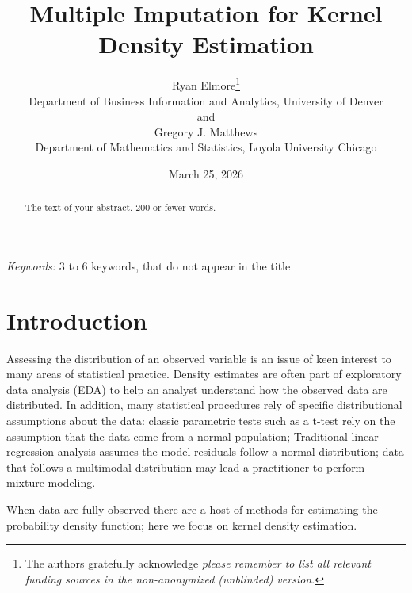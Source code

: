 \documentclass[
  12pt]{article}
\begin{document}
\def\spacingset#1{\renewcommand{\baselinestretch}%
{#1}\small\normalsize} \spacingset{1}



\date{March 25, 2026}
\title{\bf Multiple Imputation for Kernel Density Estimation}
\author{
Ryan Elmore\thanks{The authors gratefully acknowledge \emph{please
remember to list all relevant funding sources in the non-anonymized
(unblinded) version}.}\\
Department of Business Information and Analytics, University of Denver\\
and\\Gregory J. Matthews\\
Department of Mathematics and Statistics, Loyola University Chicago\\
}
\maketitle

\bigskip
\bigskip
\begin{abstract}
The text of your abstract. 200 or fewer words.
\end{abstract}

\noindent%
{\it Keywords:} 3 to 6 keywords, that do not appear in the title
\vfill

\newpage
\spacingset{1.9} %


\section{Introduction}\label{sec-intro}

Assessing the distribution of an observed variable is an issue of keen
interest to many areas of statistical practice. Density estimates are
often part of exploratory data analysis (EDA) to help an analyst
understand how the observed data are distributed. In addition, many
statistical procedures rely of specific distributional assumptions about
the data: classic parametric tests such as a t-test rely on the
assumption that the data come from a normal population; Traditional
linear regression analysis assumes the model residuals follow a normal
distribution; data that follows a multimodal distribution may lead a
practitioner to perform mixture modeling.

When data are fully observed there are a host of methods for estimating
the probability density function; here we focus on kernel density
estimation.
\end{document}
